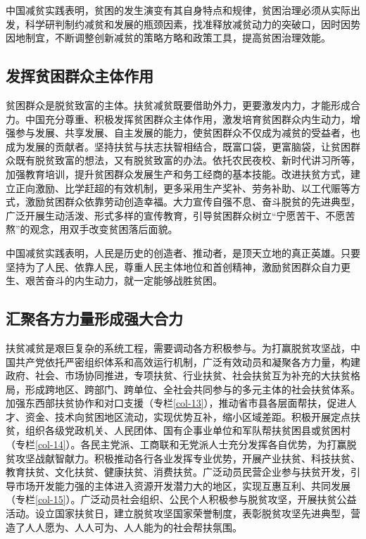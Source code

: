 \documentclass{ctexart}
\begin{document}
中国减贫实践表明，贫困的发生演变有其自身特点和规律，贫困治理必须从实际出发，科学研判制约减贫和发展的瓶颈因素，找准释放减贫动力的突破口，因时因势因地制宜，不断调整创新减贫的策略方略和政策工具，提高贫困治理效能。

\subsection{发挥贫困群众主体作用}

贫困群众是脱贫致富的主体。扶贫减贫既要借助外力，更要激发内力，才能形成合力。中国充分尊重、积极发挥贫困群众主体作用，激发培育贫困群众内生动力，增强参与发展、共享发展、自主发展的能力，使贫困群众不仅成为减贫的受益者，也成为发展的贡献者。坚持扶贫与扶志扶智相结合，既富口袋，更富脑袋，让贫困群众既有脱贫致富的想法，又有脱贫致富的办法。依托农民夜校、新时代讲习所等，加强教育培训，提升贫困群众发展生产和务工经商的基本技能。改进扶贫方式，建立正向激励、比学赶超的有效机制，更多采用生产奖补、劳务补助、以工代赈等方式，激励贫困群众依靠劳动创造幸福。大力宣传自强不息、奋斗脱贫的先进典型，广泛开展生动活泼、形式多样的宣传教育，引导贫困群众树立“宁愿苦干、不愿苦熬”的观念，用双手改变贫困落后面貌。

中国减贫实践表明，人民是历史的创造者、推动者，是顶天立地的真正英雄。只要坚持为了人民、依靠人民，尊重人民主体地位和首创精神，激励贫困群众自力更生、艰苦奋斗的内生动力，就一定能够战胜贫困。

\subsection{汇聚各方力量形成强大合力}

扶贫减贫是艰巨复杂的系统工程，需要调动各方积极参与。为打赢脱贫攻坚战，中国共产党依托严密组织体系和高效运行机制，广泛有效动员和凝聚各方力量，构建政府、社会、市场协同推进，专项扶贫、行业扶贫、社会扶贫互为补充的大扶贫格局，形成跨地区、跨部门、跨单位、全社会共同参与的多元主体的社会扶贫体系。加强东西部扶贫协作和对口支援（专栏\ref{col-13}），推动省市县各层面帮扶，促进人才、资金、技术向贫困地区流动，实现优势互补，缩小区域差距。积极开展定点扶贫，组织各级党政机关、人民团体、国有企事业单位和军队帮扶贫困县或贫困村（专栏\ref{col-14}）。各民主党派、工商联和无党派人士充分发挥各自优势，为打赢脱贫攻坚战献智献力。积极推动各行各业发挥专业优势，开展产业扶贫、科技扶贫、教育扶贫、文化扶贫、健康扶贫、消费扶贫。广泛动员民营企业参与扶贫开发，引导市场开发能力强的主体进入资源开发潜力大的地区，实现互惠互利、共同发展（专栏\ref{col-15}）。广泛动员社会组织、公民个人积极参与脱贫攻坚，开展扶贫公益活动。设立国家扶贫日，建立脱贫攻坚国家荣誉制度，表彰脱贫攻坚先进典型，营造了人人愿为、人人可为、人人能为的社会帮扶氛围。
\end{document}
